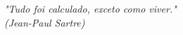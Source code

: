\begin{epigrafe}
\vspace*{\fill}
\begin{flushright}
  \textit{"Tudo foi calculado, exceto como viver." \\
  (Jean-Paul Sartre)}
\end{flushright}
\end{epigrafe}
